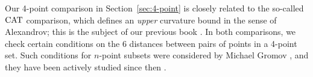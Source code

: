 Our 4-point comparison in Section~\ref{sec:4-point} is closely related to the so-called $\mathrm{CAT}$ comparison, which defines an \textit{upper} curvature bound in the sense of Alexandrov;
this is the subject of our previous book \cite{alexander-kapovitch-petrunin-2019}.
In both comparisons, we check certain conditions on the 6 distances between pairs of points in a 4-point set.
Such conditions for $n$-point subsets were considered by Michael Gromov \cite[Section 1.19$_+$]{gromov1999}, and they have been actively studied since then \cite{toyoda,lebedeva-petrunin-zolotov,lebedeva2019,petrunin2017,lebedeva-petrunin2024,lebedeva-petrunin2023,lebedeva-petrunin2021,lebedeva-petrunin2025,eskenazis-mendel-naor,gromov2001}.
